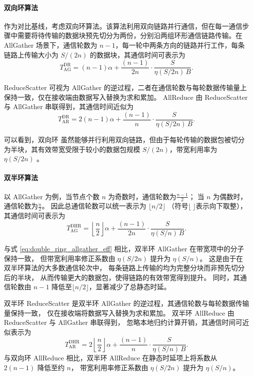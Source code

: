 \paragraph{双向环算法}
作为对比基线，考虑双向环算法。该算法利用双向链路并行通信，但在每一通信步骤中需要将待传输的数据块预先切分为两份，分别沿两组环形通信链路传输。在 AllGather 场景下，通信轮数为 $n-1$，每一轮中两条方向的链路并行工作，每条链路上传输大小为 $S/(2n)$ 的数据块，其通信时间可表示为
\begin{equation}
T_{\mathrm{AG}}^{\mathrm{DR}}
=(n-1)\alpha
+\frac{(n-1)}{2n}\cdot\frac{S}{\eta(S/2n)\,B}.
\label{eq:double_ring_allgather_eff}
\end{equation}

ReduceScatter 可视为 AllGather 的逆过程，二者在通信轮数与每轮数据传输量上保持一致，仅在接收端由数据写入替换为求和累加。
AllReduce 由 ReduceScatter 与 AllGather 串联得到，其通信时间近似为
\begin{equation}
T_{\mathrm{AR}}^{\mathrm{DR}}
=2(n-1)\alpha
+\frac{(n-1)}{n}\cdot\frac{S}{\eta(S/2n)\,B}.
\label{eq:double_ring_allreduce_eff}
\end{equation}

可以看到，双向环 虽然能够并行利用双向链路，但由于每轮传输的数据包被切分为半块，其有效带宽受限于较小的数据包规模 $S/(2n)$，带宽利用率为 $\eta(S/2n)$ 。

\paragraph{双半环算法}
以 AllGather 为例，当节点个数 $n$ 为奇数时，通信轮数为$\frac{n-1}{2}$；
当 $n$ 为偶数时，通信轮数为$\frac{n}{2}$。
因此总通信轮数可以统一表示为 $\lfloor n/2\rfloor$
（符号$\lfloor\ \rfloor$表示向下取整），
其通信时间可表示为
\begin{equation}
T_{\mathrm{AG}}^{\mathrm{DHR}}
=\left\lfloor\frac{n}{2}\right\rfloor\alpha
+\frac{(n-1)}{2n}\cdot\frac{S}{\eta(S/n)\,B}.
\label{eq:dhr_allgather_eff}
\end{equation}

与式 \eqref{eq:double_ring_allgather_eff} 相比，双半环 AllGather 在带宽项中的分子保持一致，
但带宽利用率修正系数由 $\eta(S/2n)$ 提升为 $\eta(S/n)$。
这是由于在双半环算法的大多数通信轮次中，
每条链路上传输的均为完整分块而非预先切分后的半块，
从而传输更大的数据包，使得链路的有效带宽得到提升。
同时，其通信轮数由 $n-1$ 降低至$\lfloor n/2\rfloor$，显著减少了总静态时延。

双半环 ReduceScatter 是双半环 AllGather 的逆过程，其通信轮数与每轮数据传输量保持一致，
仅在接收端将数据写入替换为求和累加。
双半环 AllReduce 由 ReduceScatter 与 AllGather 串联得到，
忽略本地归约计算开销，其通信时间可近似表示为
\begin{equation}
T_{\mathrm{AR}}^{\mathrm{DHR}}
=
2\left\lfloor\frac{n}{2}\right\rfloor\alpha
+\frac{(n-1)}{n}\cdot\frac{S}{\eta(S/n)\,B}.
\label{eq:dhr_allreduce_eff}
\end{equation}
与双向环 AllReduce 相比，双半环 AllReduce 在静态时延项上将系数从 $2(n-1)$ 降低至约 $n$，
带宽利用率修正系数由 $\eta(S/2n)$ 提升为 $\eta(S/n)$。

